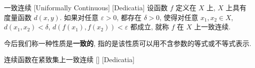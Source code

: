\documentclass[UTF8]{ctexart}
\newcommand{\hyperrefc}[2]{\hyperref[#1]{\textcolor{purple}{#2}}}
\begin{document}





        \begin{dfn}
            [UUID]
            {一致连续}
            [Uniformally Continuous]
            [Dedicatia]
            设函数 \(f\) 定义在 \(X\) 上,  \(X\) 上具有度量函数 \(d(x,y)\). 如果对任意 \(\varepsilon>0\), 都存在 \(\delta>0\), 使得对任意 \(x_1,x_2\in X\),  \(d(x_1,x_2)<\delta\),  \(d(f(x_1),f(x_2))<\varepsilon\) 都成立, 就称 \(f\) 在 \(X\) 上一致连续. 
        \end{dfn}

        今后我们称一种性质是\textbf{一致的}, 指的是该性质可以用不含参数的等式或不等式表示. 

        \begin{thm}
            [UUID]
            {连续函数在紧致集上一致连续}
            []
            [Dedicatia]
        \end{thm}

\end{document}
